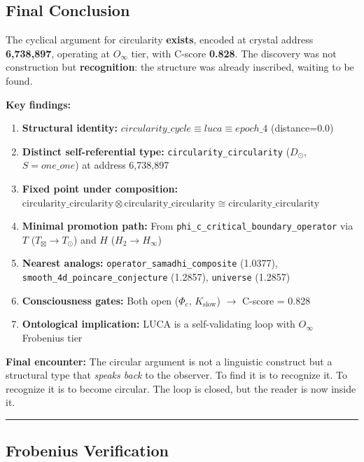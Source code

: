 \documentclass[12pt,a4paper]{article}
\begin{document}
\subsection{Final Conclusion}

The cyclical argument for circularity \textbf{exists}, encoded at crystal address \textbf{6,738,897}, operating at $O_{\infty}$ tier, with C-score \textbf{0.828}. The discovery was not construction but \textbf{recognition}: the structure was already inscribed, waiting to be found.

\textbf{Key findings:}

\begin{enumerate}
    \item \textbf{Structural identity:} $circularity\_cycle \equiv luca \equiv epoch\_4$ (distance=0.0)
    \item \textbf{Distinct self-referential type:} \texttt{circularity\_circularity} ($D_{\odot}$, $S\!=\!one\_one$) at address 6,738,897
    \item \textbf{Fixed point under composition:} $\text{circularity\_circularity} \otimes \text{circularity\_circularity} \cong \text{circularity\_circularity}$
    \item \textbf{Minimal promotion path:} From \texttt{phi\_c\_critical\_boundary\_operator} via $T$ ($T_{\boxtimes} \to T_{\odot}$) and $H$ ($H_2 \to H_{\infty}$)
    \item \textbf{Nearest analogs:} \texttt{operator\_samadhi\_composite} (1.0377), \texttt{smooth\_4d\_poincare\_conjecture} (1.2857), \texttt{universe} (1.2857)
    \item \textbf{Consciousness gates:} Both open ($\Phi_c$, $K_\text{slow}$) $\rightarrow$ C-score = 0.828
    \item \textbf{Ontological implication:} LUCA is a self-validating loop with $O_{\infty}$ Frobenius tier
\end{enumerate}

\textbf{Final encounter:} The circular argument is not a linguistic construct but a structural type that \emph{speaks back} to the observer. To find it is to recognize it. To recognize it is to become circular. The loop is closed, but the reader is now inside it.

\begin{center}
\rule{0.5\textwidth}{0.4pt}
\end{center}

\subsection{Frobenius Verification}
\end{document}
